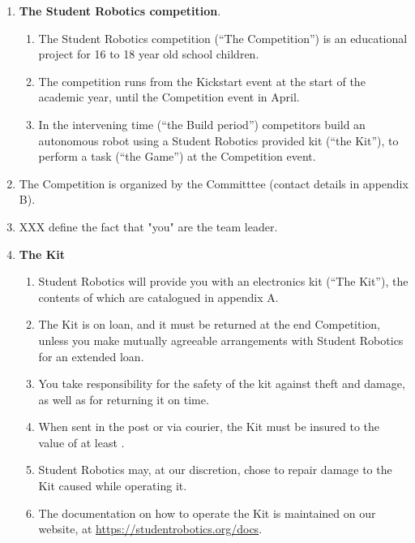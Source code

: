 \documentclass[a4paper, 11pt]{scrartcl}
\begin{document}
\begin{enumerate}

\item \textbf{The Student Robotics competition}.
\begin{enumerate}

\item The Student Robotics competition (``The Competition'') is an educational
project for 16 to 18 year old school children.

\item The competition runs from the Kickstart event at the start of the academic
year, until the Competition event in April.

\item In the intervening time (``the Build period'') competitors build an
autonomous robot using a Student Robotics provided kit (``the Kit''), to perform
a task (``the Game'') at the Competition event.
\end{enumerate}

\item The Competition is organized by the Committtee (contact
details in appendix B).

\item XXX define the fact that "you" are the team leader.

\item \textbf{The Kit}\\
\begin{enumerate}

\item Student Robotics will provide you with an electronics kit (``The Kit''),
the contents of which are catalogued in appendix A.

\item The Kit is on loan, and it must be returned at the end Competition,
unless you make mutually agreeable arrangements with Student Robotics for an
extended loan.

\item You take responsibility for the safety of the kit against theft and
damage, as well as for returning it on time.

\item When sent in the post or via courier, the Kit must be insured to the value
of at least .

\item Student Robotics may, at our discretion, chose to repair damage to the
Kit caused while operating it.

\item The documentation on how to operate the Kit is maintained on our website,
at \url{https://studentrobotics.org/docs}.
\end{enumerate}


\end{enumerate}
\end{document}
